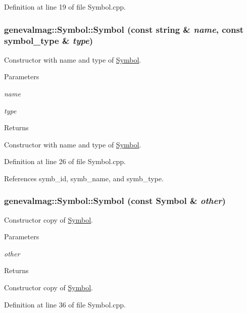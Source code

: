 Definition at line 19 of file Symbol.cpp.

\hypertarget{classgenevalmag_1_1Symbol_a2b522913fae452ad9c5a32587a122450}{
\subsubsection[{Symbol}]{\setlength{\rightskip}{0pt plus 5cm}genevalmag::Symbol::Symbol (const string \& {\em name}, \/  const {\bf symbol\_\-type} \& {\em type})}}
\label{classgenevalmag_1_1Symbol_a2b522913fae452ad9c5a32587a122450}
Constructor with name and type of \hyperlink{classgenevalmag_1_1Symbol}{Symbol}. 
\begin{DoxyParams}{Parameters}
\item[{\em name}]\item[{\em type}]\end{DoxyParams}
\begin{DoxyReturn}{Returns}

\end{DoxyReturn}
Constructor with name and type of \hyperlink{classgenevalmag_1_1Symbol}{Symbol}. 

Definition at line 26 of file Symbol.cpp.



References symb\_\-id, symb\_\-name, and symb\_\-type.

\hypertarget{classgenevalmag_1_1Symbol_a16cbf4081db9ad6ba822270ede78cfb6}{
\subsubsection[{Symbol}]{\setlength{\rightskip}{0pt plus 5cm}genevalmag::Symbol::Symbol (const {\bf Symbol} \& {\em other})}}
\label{classgenevalmag_1_1Symbol_a16cbf4081db9ad6ba822270ede78cfb6}
Constructor copy of \hyperlink{classgenevalmag_1_1Symbol}{Symbol}. 
\begin{DoxyParams}{Parameters}
\item[{\em other}]\end{DoxyParams}
\begin{DoxyReturn}{Returns}

\end{DoxyReturn}
Constructor copy of \hyperlink{classgenevalmag_1_1Symbol}{Symbol}. 

Definition at line 36 of file Symbol.cpp.



